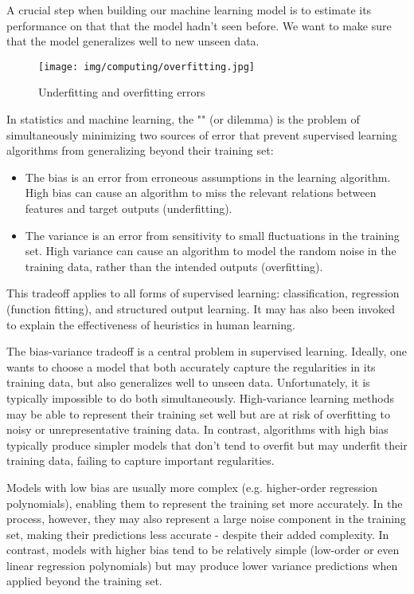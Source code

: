 	A crucial step when building our machine learning model is to estimate its performance on that that the model hadn't seen before. We want to make sure that the model generalizes well to new unseen data.
	\begin{figure}[H]
		\centering
		\texttt{[image: img/computing/overfitting.jpg]}
		\caption{Underfitting and overfitting errors}
	\end{figure}
	In statistics and machine learning, the "" (or dilemma) is the problem of simultaneously minimizing two sources of error that prevent supervised learning algorithms from generalizing beyond their training set:
	 \begin{itemize}
	 	\item The bias is an error from erroneous assumptions in the learning algorithm. High bias can cause an algorithm to miss the relevant relations between features and target outputs (underfitting).

		\item The variance is an error from sensitivity to small fluctuations in the training set. High variance can cause an algorithm to model the random noise in the training data, rather than the intended outputs (overfitting).
	\end{itemize}
	This tradeoff applies to all forms of supervised learning: classification, regression (function fitting), and structured output learning. It may has also been invoked to explain the effectiveness of heuristics in human learning.
	
	The bias-variance tradeoff is a central problem in supervised learning. Ideally, one wants to choose a model that both accurately capture the regularities in its training data, but also generalizes well to unseen data. Unfortunately, it is typically impossible to do both simultaneously. High-variance learning methods may be able to represent their training set well but are at risk of overfitting to noisy or unrepresentative training data. In contrast, algorithms with high bias typically produce simpler models that don't tend to overfit but may underfit their training data, failing to capture important regularities.
	
	Models with low bias are usually more complex (e.g. higher-order regression polynomials), enabling them to represent the training set more accurately. In the process, however, they may also represent a large noise component in the training set, making their predictions less accurate - despite their added complexity. In contrast, models with higher bias tend to be relatively simple (low-order or even linear regression polynomials) but may produce lower variance predictions when applied beyond the training set.
	
